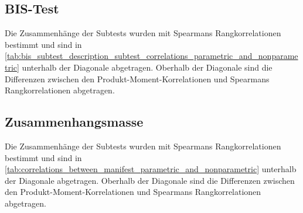 \documentclass[11pt, twoside, a4paper]{book}		%
\begin{document}
\subsection*{BIS-Test}

Die Zusammenhänge der Subtests wurden mit Spearmans Rangkorrelationen bestimmt und sind in \autoref{tab:bis_subtest_description_subtest_correlations_parametric_and_nonparametric} unterhalb der Diagonale abgetragen. Oberhalb der Diagonale sind die Differenzen zwischen den Produkt-Moment-Korrelationen und Spearmans Rangkorrelationen abgetragen.

\subsection*{Zusammenhangsmasse}

Die Zusammenhänge der Subtests wurden mit Spearmans Rangkorrelationen bestimmt und sind in \autoref{tab:correlations_between_manifest_parametric_and_nonparametric} unterhalb der Diagonale abgetragen. Oberhalb der Diagonale sind die Differenzen zwischen den Produkt-Moment-Korrelationen und Spearmans Rangkorrelationen abgetragen.
\end{document}
